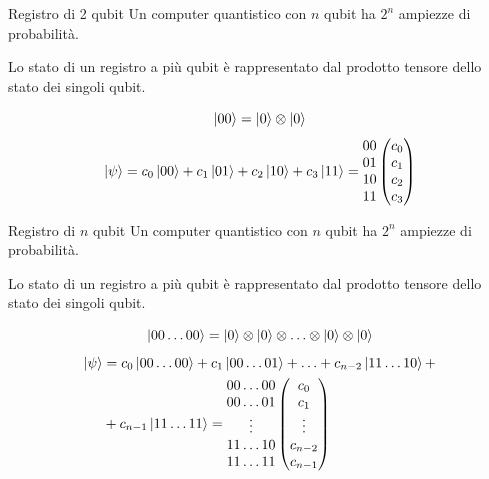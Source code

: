 \documentclass{beamer}
\begin{document}
    \begin{frame}{Registro di 2 qubit}
        Un computer quantistico con $n$ qubit ha $2^n$ ampiezze di probabilità. 

        Lo stato di un registro a più qubit è rappresentato dal prodotto tensore dello stato dei singoli qubit. 

        \begin{equation*}
            \ket{00} = \ket{0} \otimes \ket{0}
        \end{equation*}
        \begin{equation*}
            \ket{\psi} = c_0 \ket{00} + c_1 \ket{01} + c_2 \ket{10} + c_3 \ket{11} = 
            \begin{matrix}
                00 \\ 01 \\ 10 \\ 11
            \end{matrix} \begin{pmatrix}
                c_0 \\ c_1 \\ c_2 \\ c_3
            \end{pmatrix}
        \end{equation*}  
    \end{frame}

    \begin{frame}{Registro di $n$ qubit}
        Un computer quantistico con $n$ qubit ha $2^n$ ampiezze di probabilità. 

        Lo stato di un registro a più qubit è rappresentato dal prodotto tensore dello stato dei singoli qubit. 

        \begin{equation*}
            \ket{00\ldots00} = \ket{0} \otimes \ket{0} \otimes \ldots \otimes \ket{0} \otimes \ket{0}
        \end{equation*}
        \begin{equation*}
            \begin{split}
                \ket{\psi} &= c_0 \ket{00\ldots00} + c_1 \ket{00\ldots01} + \ldots + c_{n-2} \ket{11\ldots10} + \\ 
                &+ c_{n-1} \ket{11\ldots11} = \begin{matrix}
                00\ldots00 \\ 00\ldots01 \\ \vdots \\ 11\ldots10 \\ 11\ldots11
            \end{matrix} \begin{pmatrix}
                c_0 \\ c_1 \\ \vdots \\ c_{n-2} \\ c_{n-1}
            \end{pmatrix}
            \end{split}
        \end{equation*}
    \end{frame}
\end{document}
